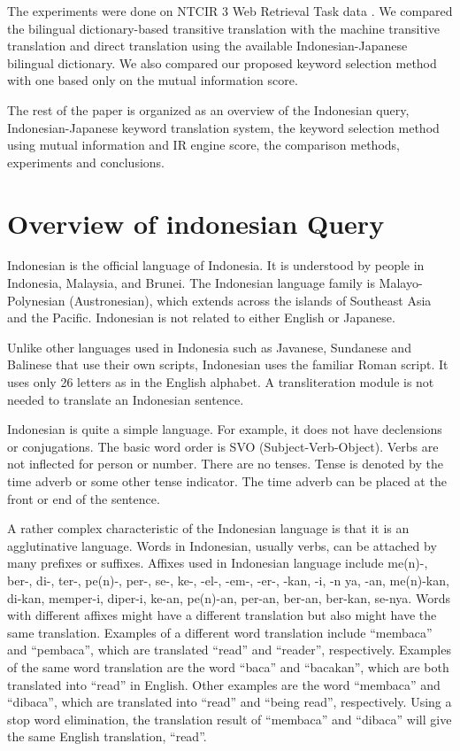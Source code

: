 \documentclass[english]{jnlp_1.3c}
\begin{document}
The experiments were done on NTCIR 3 Web Retrieval
Task data \cite{NTCIR3WEB}.  We compared the bilingual dictionary-based transitive
translation with the machine transitive translation and direct
translation using the available Indonesian-Japanese bilingual
dictionary.  We also compared our proposed keyword selection method with
one based only on the mutual information score.

The rest of the paper is organized as an overview of the Indonesian
query, Indonesian-Japanese keyword translation system, the keyword
selection method using mutual information and IR engine score, the
comparison methods, experiments and conclusions.

\section{Overview of indonesian Query}
\label{Overview of indonesian Query}

Indonesian is the official language of Indonesia. It is understood by
people in Indonesia, Malaysia, and Brunei. The Indonesian language
family is Malayo-Polynesian (Austronesian), which extends across the
islands of Southeast Asia and the Pacific.  Indonesian is not related to
either English or Japanese.

Unlike other languages used in Indonesia such as Javanese, Sundanese and
Balinese that use their own scripts, Indonesian uses the familiar Roman
script. It uses only 26 letters as in the English alphabet. A
transliteration module is not needed to translate an Indonesian
sentence.

Indonesian is quite a simple language. For example, it does not have
declensions or conjugations. The basic word order is SVO
(Subject-Verb-Object). Verbs are not inflected for person or
number. There are no tenses. Tense is denoted by the time adverb or some
other tense indicator. The time adverb can be placed at the front or end
of the sentence.

A rather complex characteristic of the Indonesian language is that it is
an agglutinative language. Words in Indonesian, usually verbs, can be
attached by many prefixes or suffixes. Affixes used in Indonesian
language include \cite{kosasih2003} me(n)-, ber-, di-, ter-, pe(n)-, per-,
se-, ke-, -el-, -em-, -er-, -kan, -i, -n ya, -an, me(n)-kan, di-kan,
memper-i, diper-i, ke-an, pe(n)-an, per-an, ber-an, ber-kan,
se-nya. Words with different affixes might have a different translation
but also might have the same translation. Examples of a different word
translation include ``membaca'' and ``pembaca'', which are translated
``read'' and ``reader'', respectively. Examples of the same word
translation are the word ``baca'' and ``bacakan'', which are both
translated into ``read'' in English. Other examples are the word
``membaca'' and ``dibaca'', which are translated into ``read'' and
``being read'', respectively. Using a stop word elimination, the
translation result of ``membaca'' and ``dibaca'' will give the same
English translation, ``read''.
\end{document}
